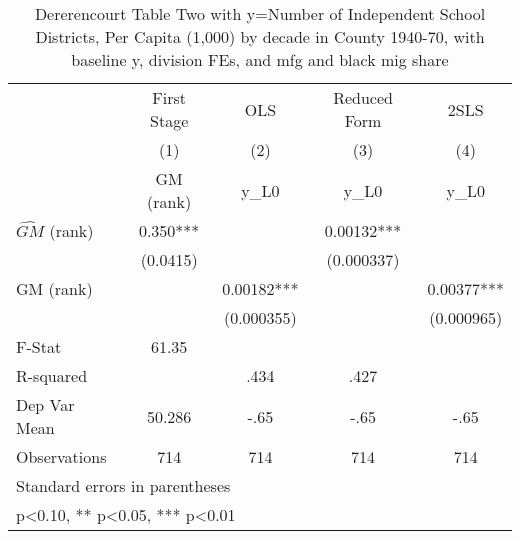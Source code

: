 \begin{table}[htbp]\centering
\def\sym#1{\ifmmode^{#1}\else\(^{#1}\)\fi}
\caption{Dererencourt Table Two with y=Number of Independent School Districts, Per Capita (1,000) by decade in County 1940-70, with baseline y, division FEs, and mfg and black mig share}
\begin{tabular}{l*{4}{c}}
\toprule
                    & First Stage   &         OLS   &Reduced Form   &        2SLS   \\
                    &\multicolumn{1}{c}{(1)}&\multicolumn{1}{c}{(2)}&\multicolumn{1}{c}{(3)}&\multicolumn{1}{c}{(4)}\\
                    &\multicolumn{1}{c}{GM  (rank)}&\multicolumn{1}{c}{y\_L0}&\multicolumn{1}{c}{y\_L0}&\multicolumn{1}{c}{y\_L0}\\
\midrule
$\hat{GM}$ (rank)   &       0.350***&               &     0.00132***&               \\
                    &    (0.0415)   &               &  (0.000337)   &               \\
\addlinespace
GM  (rank)          &               &     0.00182***&               &     0.00377***\\
                    &               &  (0.000355)   &               &  (0.000965)   \\
\midrule
F-Stat              &       61.35   &               &               &               \\
R-squared           &               &        .434   &        .427   &               \\
Dep Var Mean        &      50.286   &        -.65   &        -.65   &        -.65   \\
Observations        &         714   &         714   &         714   &         714   \\
\bottomrule
\multicolumn{5}{l}{\footnotesize Standard errors in parentheses}\\
\multicolumn{5}{l}{\footnotesize * p<0.10, ** p<0.05, *** p<0.01}\\
\end{tabular}
\end{table}
